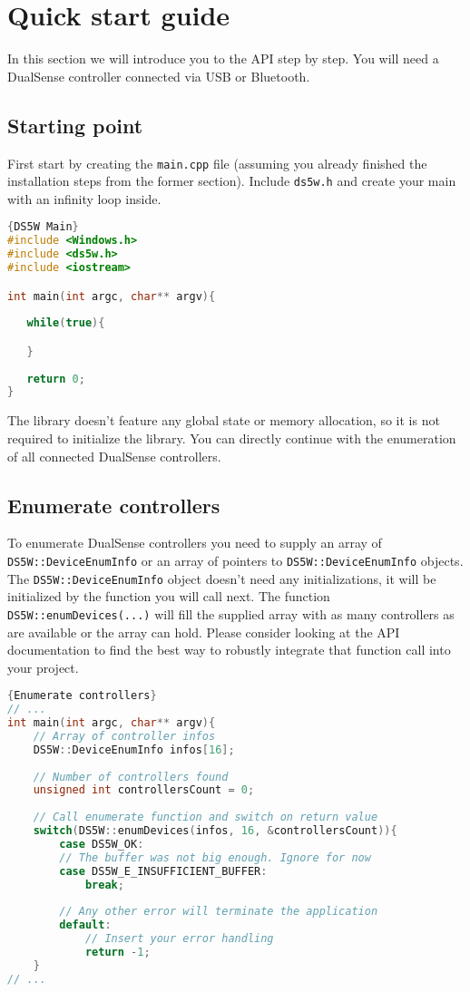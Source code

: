 \section{Quick start guide}
In this section we will introduce you to the API step by step. You will need a DualSense controller connected via USB or Bluetooth.

\subsection{Starting point}
First start by creating the \texttt{main.cpp} file (assuming you already finished the installation steps from the former section). Include \texttt{ds5w.h} and create your main with an infinity loop inside.
\begin{lstlisting}[language=C++,label=code0,caption={DS5W Main}]{DS5W Main}
#include <Windows.h>
#include <ds5w.h>
#include <iostream>

int main(int argc, char** argv){
   
   while(true){

   }
   
   return 0;
}
\end{lstlisting}
The library doesn't feature any global state or memory allocation, so it is not required to initialize the library. You can directly continue with the enumeration of all connected DualSense controllers.

\subsection{Enumerate controllers}
To enumerate DualSense controllers you need to supply an array of \texttt{DS5W::DeviceEnumInfo} or an array of pointers to \texttt{DS5W::DeviceEnumInfo} objects. The \texttt{DS5W::DeviceEnumInfo} object doesn't need any initializations, it will be initialized by the function you will call next. The function \texttt{DS5W::enumDevices(...)} will fill the supplied array with as many controllers as are available or the array can hold. Please consider looking at the API documentation to find the best way to robustly integrate that function call into your project.\\

\begin{minipage}{\textwidth}
\begin{lstlisting}[language=C++,label=code1,caption={Enumerate controllers}]{Enumerate controllers}
// ...
int main(int argc, char** argv){
	// Array of controller infos
	DS5W::DeviceEnumInfo infos[16];
	
	// Number of controllers found
	unsigned int controllersCount = 0;
	
	// Call enumerate function and switch on return value
	switch(DS5W::enumDevices(infos, 16, &controllersCount)){
		case DS5W_OK:
		// The buffer was not big enough. Ignore for now
		case DS5W_E_INSUFFICIENT_BUFFER:
			break;
			
		// Any other error will terminate the application
		default:
			// Insert your error handling
			return -1;
	}
// ...
\end{lstlisting}
\end{minipage}

